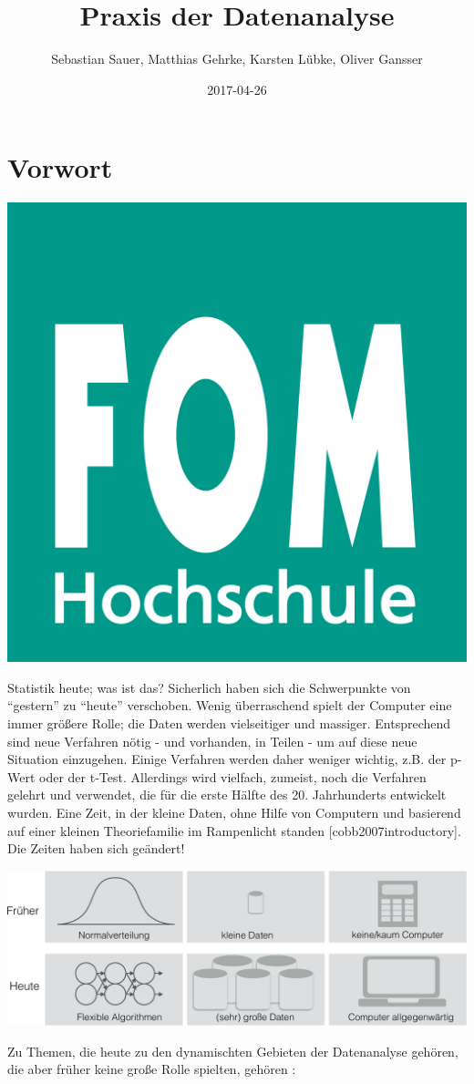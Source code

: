 \documentclass[12pt,ngerman,]{book}
\title{Praxis der Datenanalyse}
\author{Sebastian Sauer, Matthias Gehrke, Karsten Lübke, Oliver Gansser}
\date{2017-04-26}
\begin{document}
\maketitle

{
\hypersetup{linkcolor=black}
\setcounter{tocdepth}{1}
\tableofcontents
}
\listoffigures
\chapter*{Vorwort}\label{vorwort}

\begin{center}\includegraphics[width=0.3\linewidth]{images/FOM} \end{center}

Statistik heute; was ist das? Sicherlich haben sich die Schwerpunkte von
``gestern'' zu ``heute'' verschoben. Wenig überraschend spielt der
Computer eine immer größere Rolle; die Daten werden vielseitiger und
massiger. Entsprechend sind neue Verfahren nötig - und vorhanden, in
Teilen - um auf diese neue Situation einzugehen. Einige Verfahren werden
daher weniger wichtig, z.B. der p-Wert oder der t-Test. Allerdings wird
vielfach, zumeist, noch die Verfahren gelehrt und verwendet, die für die
erste Hälfte des 20. Jahrhunderts entwickelt wurden. Eine Zeit, in der
kleine Daten, ohne Hilfe von Computern und basierend auf einer kleinen
Theoriefamilie im Rampenlicht standen {[}cobb2007introductory{]}. Die
Zeiten haben sich geändert!

\includegraphics{images/Forschung_frueher_heute.pdf}

Zu Themen, die heute zu den dynamischten Gebieten der Datenanalyse
gehören, die aber früher keine große Rolle spielten, gehören
\citep{hardin2015data}:
\end{document}
